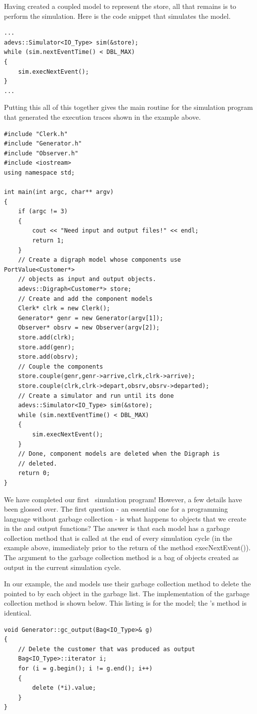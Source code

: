 Having created a coupled model to represent the store, all that remains is to perform the simulation. Here is the code snippet that simulates the model.
\begin{verbatim}
...
adevs::Simulator<IO_Type> sim(&store);
while (sim.nextEventTime() < DBL_MAX)
{
    sim.execNextEvent();
}
...
\end{verbatim}
Putting this all of this together gives the main routine for the simulation program that generated the execution traces shown in the example above.
\begin{verbatim}
#include "Clerk.h"
#include "Generator.h"
#include "Observer.h"
#include <iostream>
using namespace std;

int main(int argc, char** argv)
{
    if (argc != 3)
    {
        cout << "Need input and output files!" << endl;
        return 1;
    }
    // Create a digraph model whose components use PortValue<Customer*>
    // objects as input and output objects.
    adevs::Digraph<Customer*> store;
    // Create and add the component models
    Clerk* clrk = new Clerk();
    Generator* genr = new Generator(argv[1]);
    Observer* obsrv = new Observer(argv[2]);
    store.add(clrk);
    store.add(genr);
    store.add(obsrv);
    // Couple the components
    store.couple(genr,genr->arrive,clrk,clrk->arrive);
    store.couple(clrk,clrk->depart,obsrv,obsrv->departed);
    // Create a simulator and run until its done
    adevs::Simulator<IO_Type> sim(&store);
    while (sim.nextEventTime() < DBL_MAX)
    {
        sim.execNextEvent();
    }
    // Done, component models are deleted when the Digraph is
    // deleted.
    return 0;
}
\end{verbatim}

We have completed our first \adevs\ simulation program! However, a few details have been glossed over. The first question - an essential one for a programming language without garbage collection - is what happens to objects that we create in the  and  output functions? The answer is that each model has a garbage collection method that is called at the end of every simulation cycle (in the example above, immediately prior to the return of the method execNextEvent()). The argument to the garbage collection method is a bag of objects created as output in the current simulation cycle.

In our example, the  and  models use their garbage collection method to delete the  pointed to by each  object in the garbage list. The implementation of the garbage collection method is shown below. This listing is for the  model; the 's  method is identical.
\begin{verbatim}
void Generator::gc_output(Bag<IO_Type>& g)
{
    // Delete the customer that was produced as output
    Bag<IO_Type>::iterator i;
    for (i = g.begin(); i != g.end(); i++)
    {
        delete (*i).value;
    }
}
\end{verbatim}

